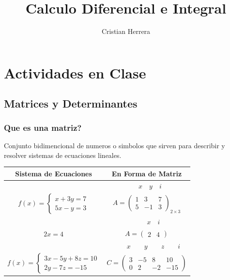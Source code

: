 \documentclass[stu, 12pt, letterpaper, donotrepeattitle, floatsintext, natbib]{apa7}
\title{\Large Calculo Diferencial e Integral}
\author{Cristian Herrera}
\affiliation{Instituto Superior Tecnológico Tena}
\begin{document}
\maketitle


\renewcommand\contentsname{\largeÍndice}
\tableofcontents
\setcounter{tocdepth}{2}
\newpage
\renewcommand{\listfigurename}{\largeÍndice de fíguras}
\listoffigures
\newpage
\renewcommand{\listtablename}{\largeÍndice de tablas}
\listoftables
\newpage


\section{Actividades en Clase}
\subsection{Matrices y Determinantes} 

\subsubsection{Que es una matriz?}
Conjunto bidimencional de numeros o simbolos que sirven para describir y resolver sistemas de ecuaciones lineales.
\begin{table}
    \centering
    \begin{tabular}{|c|c|}
        \hline
        Sistema de Ecuaciones & En Forma de Matriz \\ \hline
        & $\quad x\quad y\quad i$ \\ 
        $ f(x) =  \begin{cases} x + 3y = 7 \\ 5x - y = 3  \end{cases} $ 
        & 
        $A = \begin{pmatrix}
            1 & 3 & 7 \\
            5 & -1 & 3
        \end{pmatrix}_{2\times3}$ \\[1cm]\hline
        
        & $\quad\quad\quad x\quad i\quad $ \\
        $2x=4$ & $A = \begin{pmatrix} 2 & 4 \end{pmatrix}$ \\[0.8cm]\hline
        
        & $\quad\quad x\quad\quad y\quad\quad z\quad\quad i$ \\
        $ f(x)=\begin{cases} 3x-5y+8z=10 \\ 2y-7z=-15 \end{cases} $ & 
        $C=\begin{pmatrix}
            3 & -5 & 8 & 10 \\ 
            0 & 2 & -2 & -15
        \end{pmatrix}$ \\[1cm]\hline
    \end{tabular}
\end{table}
\end{document}
